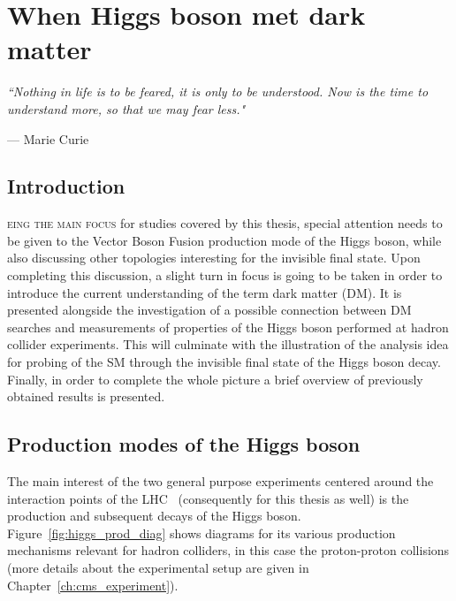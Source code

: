 \chapter{When Higgs boson met dark matter}
\epigraph{\itshape``Nothing in life is to be feared, it is only to be understood. Now is the time to understand more, so that we may fear less."}{--- \textup{Marie Curie}}
\label{ch:Higgs_LHC_DM}
\section{Introduction}


\hspace{10pt}\lettrine[lines=2]{}{eing the main focus} for studies covered by this thesis, special attention needs to be given to the Vector Boson Fusion production mode of the Higgs boson, while also discussing other topologies interesting for the invisible final state. Upon completing this discussion, a slight turn in focus is going to be taken in order to introduce the current understanding of the term dark matter (DM). It is presented alongside the investigation of a possible connection between DM searches and measurements of properties of the Higgs boson performed at hadron collider experiments. This will culminate with the illustration of the analysis idea for probing of the SM through the invisible final state of the Higgs boson decay. Finally, in order to complete the whole picture a brief overview of previously obtained results is presented.


\section{Production modes of the Higgs boson}
\label{sec:prod_higgs}
\hspace{10pt} The main interest of the two general purpose experiments centered around the interaction points of the LHC~\cite{LHC_TDR} (consequently for this thesis as well) is the production and subsequent decays of the Higgs boson. Figure~\ref{fig:higgs_prod_diag} shows diagrams for its various production mechanisms relevant for hadron colliders, in this case the proton-proton collisions (more details about the experimental setup are given in Chapter~\ref{ch:cms_experiment}).

